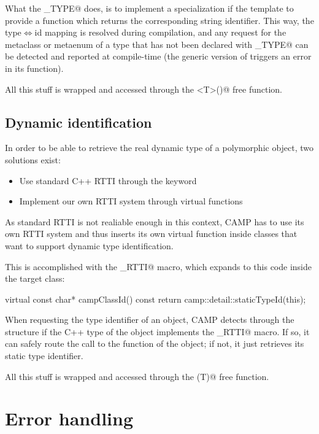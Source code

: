 \documentclass[a4paper, twoside]{report}
\begin{document}
	What the \verb@CAMP_TYPE@ does, is to implement a specialization if the \verb@StaticTypeId@ template
	to provide a \verb@get@ function which returns the corresponding string identifier.
	This way, the type$\Leftrightarrow$id mapping is resolved during compilation, and any request for the metaclass
	or metaenum of a type that has not been declared with \verb@CAMP_TYPE@ can be detected and reported
	at compile-time (the generic version of \verb@StaticTypeId@ triggers an error in its \verb@get@ function).
	
	All this stuff is wrapped and accessed through the ()@ free function.

\section{Dynamic identification}

	In order to be able to retrieve the real dynamic type of a polymorphic object, two solutions exist:
	
	\begin{itemize}
		\item Use standard C++ RTTI through the \verb@typeid@ keyword
		\item Implement our own RTTI system through virtual functions
	\end{itemize}
	
	As standard RTTI is not realiable enough in this context, CAMP has to use its own RTTI system and thus
	inserts its own virtual function inside classes that want to support dynamic type identification.
	
	This is accomplished with the \verb@CAMP_RTTI@ macro, which expands to this code inside the target class:
	
\begin{cppcode}
virtual const char* campClassId() const
{
    return camp::detail::staticTypeId(this);
}
\end{cppcode}

	When requesting the type identifier of an object, CAMP detects through the
	\verb@HasDynamicTypeId@ structure if the C++ type of the object implements the \verb@CAMP_RTTI@ macro.
	If so, it can safely route the call to the \verb@campClassId@ function of the object; if not,
	it just retrieves its static type identifier.
	
	All this stuff is wrapped and accessed through the \verb@typeId(T)@ free function.

\chapter{Error handling}
\end{document}
